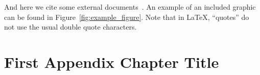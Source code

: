 \documentclass[a4paper, oneside]{discothesis}
\begin{document}
And here we cite some external documents~\cite{TestReference, TestReference2}.
An example of an included graphic can be found in Figure~\ref{fig:example_figure}.
Note that in \LaTeX, ``quotes'' do not use the usual double quote characters.




\appendix
\chapter{First Appendix Chapter Title}
\end{document}
